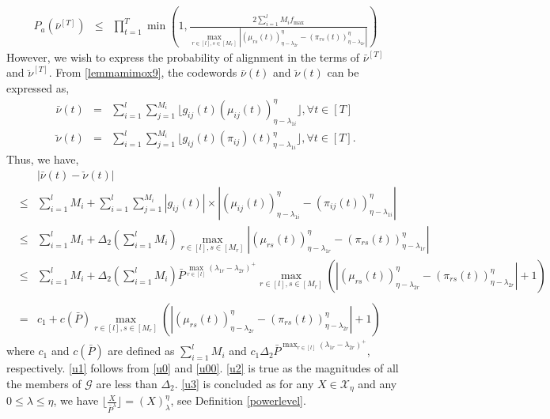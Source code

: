 \documentclass[11pt]{article}
\begin{document}
\begin{eqnarray}
P_a(\bar{\nu}^{[T]})&\le&\prod_{t=1}^T\min\left(1,\frac{2\sum_{i=1}^lM_if_{\max}}{\max_{r\in[l],s\in[M_r]}\left|(\mu_{rs}(t))_{\eta-\lambda_{2r}}^{\eta}- (\pi_{rs}(t))_{\eta-\lambda_{2r}}^{\eta}\right|}\right)\label{u000}
\end{eqnarray}
However, we wish to express the probability of alignment in the terms of $\bar{\nu}^{[T]}$ and $\breve{\nu}^{[T]}$. From \eqref{lemmamimox9}, the codewords $\bar{\nu}(t)$ and $\breve{\nu}(t)$ can be expressed as,
\begin{eqnarray}
\bar{\nu}(t)&=&\sum_{i=1}^l\sum_{j=1}^{M_i}\lfloor g_{ij} (t)(\mu_{ij}(t))_{\eta-\lambda_{1i}}^{\eta}\rfloor, \forall t\in[T]\label{u0}\\
\breve{\nu}(t)&=&\sum_{i=1}^l\sum_{j=1}^{M_i}\lfloor g_{ij}(t) (\pi_{ij})(t)_{\eta-\lambda_{1i}}^{\eta}\rfloor\label{equal2}, \forall t\in[T].\label{u00}
\end{eqnarray}
Thus, we have,
\begin{eqnarray}
&&|\bar{\nu}(t)-\breve{\nu}(t)|\nonumber\\
&\le&\sum_{i=1}^lM_i+\sum_{i=1}^l\sum_{j=1}^{M_i}|g_{ij} (t)|\times|(\mu_{ij}(t))_{\eta-\lambda_{1i}}^{\eta}-(\pi_{ij}(t))_{\eta-\lambda_{1i}}^{\eta}|\label{u1}\\
&\le&\sum_{i=1}^lM_i+\Delta_2\left(\sum_{i=1}^lM_i\right)\max_{r\in[l],s\in[M_r]}\left|(\mu_{rs}(t))_{\eta-\lambda_{1r}}^{\eta}- (\pi_{rs}(t))_{\eta-\lambda_{1r}}^{\eta}\right|\label{u2}\\
&\le&\sum_{i=1}^lM_i+\Delta_2\left(\sum_{i=1}^lM_i\right)\bar{P}^{\max_{r\in[l]}(\lambda_{1r}-\lambda_{2r})^+}\max_{r\in[l],s\in[M_r]}\left(\left|(\mu_{rs}(t))_{\eta-\lambda_{2r}}^{\eta}- (\pi_{rs}(t))_{\eta-\lambda_{2r}}^{\eta}\right|+1\right)\nonumber\\\label{u3}\\
&=&c_1+c(\bar{P})\max_{r\in[l],s\in[M_r]}\left(\left|(\mu_{rs}(t))_{\eta-\lambda_{2r}}^{\eta}- (\pi_{rs}(t))_{\eta-\lambda_{2r}}^{\eta}\right|+1\right)\label{u33}
\end{eqnarray}
where $c_1$ and $c(\bar{P})$ are defined as $\sum_{i=1}^lM_i$ and $c_1\Delta_2\bar{P}^{\max_{r\in[l]}(\lambda_{1r}-\lambda_{2r})^+}$, respectively. \eqref{u1} follows from \eqref{u0} and \eqref{u00}. \eqref{u2} is true as the magnitudes of all the members of $\mathcal{G}$ are less than $\Delta_2$. \eqref{u3} is concluded as for any $X\in\mathcal{X}_{\eta}$ and any $0\le\lambda\le\eta$, we have $\lfloor \frac{X}{\bar{P}^{\lambda}}\rfloor=(X)_{\lambda}^{\eta}$, see Definition \ref{powerlevel}.
\end{document}

